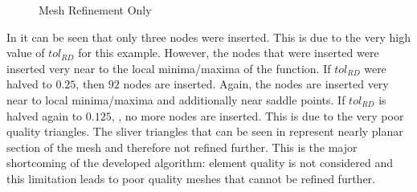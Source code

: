 \begin{figure}[h!]
  \centering
  \label{fig_RefineOnly}


  \caption{Mesh Refinement Only}
\end{figure}

In  it can be seen that only three nodes were
inserted. This is due to the very high value of $tol_{RD}$ for this example.
However, the nodes that were inserted were inserted very near to the
local minima/maxima of the function. If $tol_{RD}$ were halved to $0.25$,
 then $92$ nodes are inserted. Again, the nodes
are inserted very near to local minima/maxima and additionally near saddle
points. If $tol_{RD}$ is halved again to $0.125$, , no
more nodes are inserted. This is due to the very poor quality triangles.
The sliver triangles that can be seen in
 represent nearly planar section
of the mesh and therefore not refined further. This is the major
shortcoming of the developed algorithm: element quality is not
considered and this limitation leads to poor quality meshes that cannot
be refined further.

